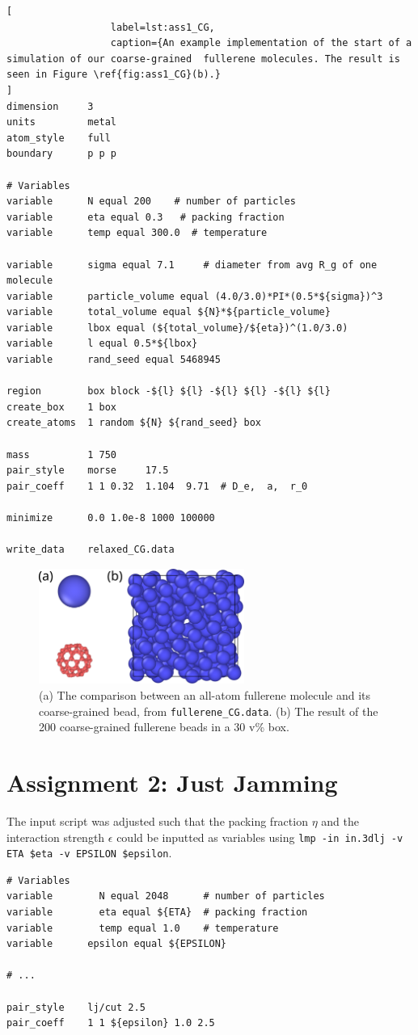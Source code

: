 \documentclass[10pt,a4paper]{labreport}
\begin{document}
\begin{lstlisting}[
                  label=lst:ass1_CG,
                  caption={An example implementation of the start of a simulation of our coarse-grained  fullerene molecules. The result is seen in Figure \ref{fig:ass1_CG}(b).}
]
dimension     3
units         metal
atom_style    full
boundary      p p p

# Variables
variable      N equal 200    # number of particles   
variable      eta equal 0.3   # packing fraction    
variable      temp equal 300.0  # temperature

variable      sigma equal 7.1     # diameter from avg R_g of one molecule
variable      particle_volume equal (4.0/3.0)*PI*(0.5*${sigma})^3  
variable      total_volume equal ${N}*${particle_volume}
variable      lbox equal (${total_volume}/${eta})^(1.0/3.0) 
variable      l equal 0.5*${lbox}
variable      rand_seed equal 5468945

region        box block -${l} ${l} -${l} ${l} -${l} ${l}
create_box    1 box
create_atoms  1 random ${N} ${rand_seed} box

mass          1 750
pair_style    morse     17.5
pair_coeff    1 1 0.32  1.104  9.71  # D_e,  a,  r_0 

minimize      0.0 1.0e-8 1000 100000

write_data    relaxed_CG.data
\end{lstlisting}
\begin{figure}[h!]
  \centering
  \includegraphics[width = 0.6\textwidth]{figs/ass1_CG.png}
  \caption{(a) The comparison between an all-atom fullerene molecule and its coarse-grained bead, from \texttt{fullerene\_CG.data}. (b) The result of the 200 coarse-grained fullerene beads in a 30 v\% box.}
  \label{fig:ass1_CG}
\end{figure}

\newpage
\section{Assignment 2: Just Jamming}
The input script was adjusted such that the packing fraction $\eta$ and the interaction strength $\epsilon$ could be inputted as variables using \texttt{lmp -in in.3dlj -v ETA \$eta -v EPSILON \$epsilon}. 
\begin{lstlisting}
# Variables
variable 	    N equal 2048      # number of particles   
variable 	    eta equal ${ETA}  # packing fraction     
variable 	    temp equal 1.0    # temperature
variable      epsilon equal ${EPSILON}

# ...

pair_style	  lj/cut 2.5
pair_coeff	  1 1 ${epsilon} 1.0 2.5 
\end{lstlisting}
\end{document}
